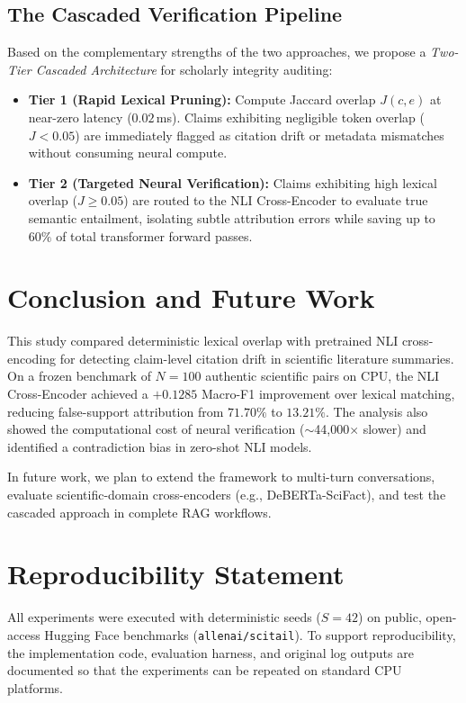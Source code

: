 \documentclass[11pt,a4paper]{article}
\begin{document}
\subsection{The Cascaded Verification Pipeline}
Based on the complementary strengths of the two approaches, we propose a \textit{Two-Tier Cascaded Architecture} for scholarly integrity auditing:
\begin{itemize}
    \item \textbf{Tier 1 (Rapid Lexical Pruning):} Compute Jaccard overlap $J(c, e)$ at near-zero latency ($0.02$\,ms). Claims exhibiting negligible token overlap ($J < 0.05$) are immediately flagged as citation drift or metadata mismatches without consuming neural compute.
    \item \textbf{Tier 2 (Targeted Neural Verification):} Claims exhibiting high lexical overlap ($J \ge 0.05$) are routed to the NLI Cross-Encoder to evaluate true semantic entailment, isolating subtle attribution errors while saving up to $60\%$ of total transformer forward passes.
\end{itemize}

\section{Conclusion and Future Work}
\label{sec:conclusion}
This study compared deterministic lexical overlap with pretrained NLI cross-encoding for detecting claim-level citation drift in scientific literature summaries. On a frozen benchmark of $N=100$ authentic scientific pairs on CPU, the NLI Cross-Encoder achieved a $+0.1285$ Macro-F1 improvement over lexical matching, reducing false-support attribution from $71.70\%$ to $13.21\%$. The analysis also showed the computational cost of neural verification ($\sim$44,000$\times$ slower) and identified a contradiction bias in zero-shot NLI models. 

In future work, we plan to extend the framework to multi-turn conversations, evaluate scientific-domain cross-encoders (e.g., DeBERTa-SciFact), and test the cascaded approach in complete RAG workflows.

\section*{Reproducibility Statement}
All experiments were executed with deterministic seeds ($S=42$) on public, open-access Hugging Face benchmarks (\texttt{allenai/scitail}). To support reproducibility, the implementation code, evaluation harness, and original log outputs are documented so that the experiments can be repeated on standard CPU platforms.



\end{document}
